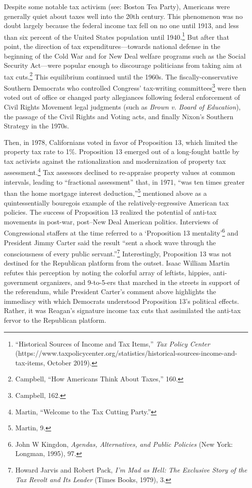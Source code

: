 \documentclass[12pt,oneside]{psthesis}
\begin{document}
Despite some notable tax activism (see: Boston Tea Party), Americans were generally quiet about taxes well into the 20th century.
This phenomenon was no doubt largely because the federal income tax fell on no one until 1913, and less than six percent of the United States population until 1940.\footnote{``Historical Sources of Income and Tax Items,'' \emph{Tax Policy Center} (https://www.taxpolicycenter.org/statistics/historical-sources-income-and-tax-items, October 2019).}
But after that point, the direction of tax expenditures---towards national defense in the beginning of the Cold War and for New Deal welfare programs such as the Social Security Act---were popular enough to discourage politicians from taking aim at tax cuts.\footnote{Campbell, ``How Americans Think About Taxes,'' 160.}
This equilibrium continued until the 1960s.
The fiscally-conservative Southern Democrats who controlled Congress' tax-writing committees\footnote{Campbell, 162.} were then voted out of office or changed party allegiances following federal enforcement of Civil Rights Movement legal judgments (such as \emph{Brown v. Board of Education}), the passage of the Civil Rights and Voting acts, and finally Nixon's Southern Strategy in the 1970s.

Then, in 1978, Californians voted in favor of Proposition 13, which limited the property tax rate to 1\%.
Proposition 13 emerged out of a long-fought battle by tax activists against the rationalization and modernization of property tax assessment.\footnote{Martin, ``Welcome to the Tax Cutting Party.''}
Tax assessors declined to re-appraise property values at common intervals, leading to ``fractional assessment'' that, in 1971, ``was ten times greater than the home mortgage interest deduction,''\footnote{Martin, 9.} mentioned above as a quintessentially bouregois example of the relatively-regressive American tax policies.
The success of Proposition 13 realized the potential of anti-tax movements in post-war, post--New Deal American politics.
Interviews of Congressional staffers at the time referred to a `Proposition 13 mentality'\footnote{John W Kingdon, \emph{Agendas, Alternatives, and Public Policies} (New York: Longman, 1995), 97.} and President Jimmy Carter said the result ``sent a shock wave through the consciousness of every public servant.''\footnote{Howard Jarvis and Robert Pack, \emph{I'm Mad as Hell: The Exclusive Story of the Tax Revolt and Its Leader} (Times Books, 1979), 3.}
Interestingly, Proposition 13 was not destined for the Republican platform from the outset.
Isaac William Martin refutes this perception by noting the colorful array of leftists, hippies, anti-government organizers, and 9-to-5-ers that marched in the streets in support of the referendum, while President Carter's comment above highlights the immediacy with which Democrats understood Proposition 13's political effects.
Rather, it was Reagan's signature income tax cuts that assimilated the anti-tax fervor to the Republican platform.
\end{document}
